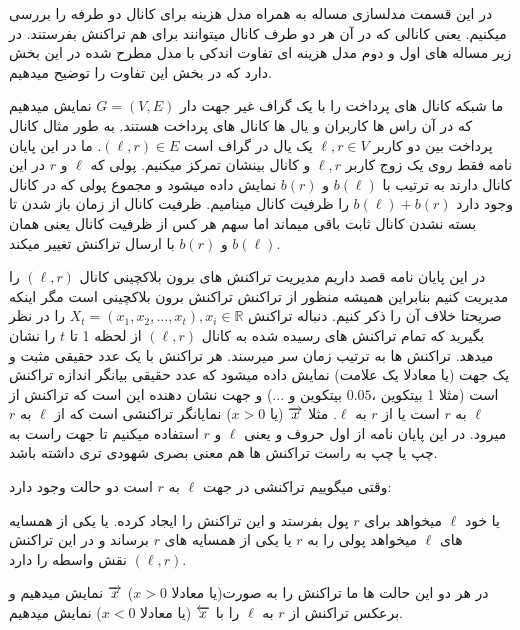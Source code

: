 
 در این قسمت مدلسازی مساله به همراه مدل هزینه برای کانال دو طرفه را بررسی میکنیم. یعنی کانالی که در آن هر دو طرف کانال میتوانند برای هم تراکنش بفرستند. در زیر مساله های اول و دوم مدل هزینه ای تفاوت اندکی با مدل مطرح شده در این بخش دارد که در بخش  این تفاوت را توضیح میدهیم.

 ما شبکه کانال های پرداخت را با یک گراف غیر جهت دار 
$G=(V,E)$
نمایش میدهیم که در آن راس ها کاربران و یال ها کانال های پرداخت هستند. به طور مثال کانال پرداخت بین دو کاربر 
$\ell , r \in V$
یک یال در گراف است
$(\ell , r) \in E$.
ما در این پایان نامه فقط روی یک زوج کاربر
$\ell , r$
و کانال بینشان تمرکز میکنیم. پولی که 
$\ell$ و $r$
در این کانال دارند به ترتیب با 
$b(\ell)$ و $b(r)$
نمایش داده میشود و مجموع پولی که در کانال وجود دارد 
$b(\ell)+b(r)$
را ظرفیت کانال مینامیم. ظرفیت کانال از زمان باز شدن تا بسته نشدن کانال ثابت باقی میماند اما سهم هر کس از ظرفیت کانال یعنی همان
$b(\ell)$ و $b(r)$
با ارسال تراکنش تغییر میکند.



 در این پایان نامه قصد داریم مدیریت تراکنش های برون بلاکچینی کانال 
$(\ell , r)$
را مدیریت کنیم بنابراین همیشه منظور از تراکنش تراکنش برون بلاکچینی است مگر اینکه صریحتا خلاف آن را ذکر کنیم. دنباله تراکنش 
$X_t=(x_1,x_2,\dots,x_t), x_i \in \mathbb{R}$
را در نظر بگیرید که تمام تراکنش های رسیده شده به کانال 
$(\ell , r)$
 از لحظه 1 تا $t$  را نشان میدهد. تراکنش ها به ترتیب زمان سر میرسند. هر تراکنش با یک عدد حقیقی مثبت و یک جهت (یا معادلا یک علامت) نمایش داده میشود که عدد حقیقی بیانگر اندازه تراکنش است (مثلا 1 بیتکوین ،$0.05$ بیتکوین و ...) و جهت نشان دهنده این است که تراکنش از 
$\ell$ به $r$
است یا از 
$r$ به $\ell$. 
مثلا
$\overrightarrow{x}$ (یا $x > 0$)
نمایانگر تراکنشی است که از 
$\ell$ به $r$
میرود. در این پایان نامه از اول حروف  و  یعنی $\ell$ و $r$ استفاده میکنیم تا جهت راست به چپ یا چپ به راست تراکنش ها هم معنی بصری شهودی تری داشته باشد.

وقتی میگوییم تراکنشی در جهت
$\ell$ به $r$
است دو حالت وجود دارد:
\begin{شمارش}
 یا خود 
$\ell$ 
میخواهد برای 
$r$
پول بفرستد و این تراکنش را ایجاد کرده.
 یا یکی از همسایه های $\ell$  میخواهد پولی را به $r$ یا یکی از همسایه های $r$ برساند و در این تراکنش 
$(\ell , r)$
نقش واسطه را دارد.
\end{شمارش}

در هر دو این حالت ها ما تراکنش را به صورت(یا معادلا $x > 0$) $\overrightarrow{x}$ نمایش میدهیم و برعکس تراکنش از
$r$ به $\ell$
را با 
$\overleftarrow{x}$ (یا معادلا $x < 0$)
نمایش میدهیم.

